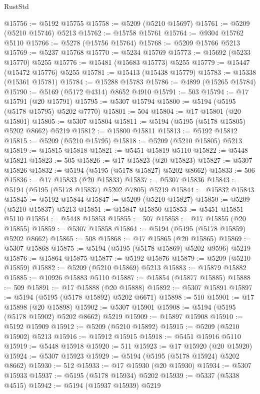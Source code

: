 \begin{lexlean}{RustStd}
\begin{coremodule}
@15756 := @5192 @15755
@15758 := @5209 (@5210 @15697)
@15761 := @5209 (@5210 @15746) @5213
@15762 := @15758 @15761
@15764 := @9304 @15762 @5110
@15766 := @5278 (@15756 @15764)
@15768 := @5209 @15766 @5213
@15769 := @5237 @15768
@15770 := @5234 @15769
@15773 := @15692 (@5233 @15770) @5255
@15776 := @15481 (@15683 @15773) @5255
@15779 := @15447 (@15472 @15776) @5255
@15781 := @15413 (@15438 @15779)
@15783 := @15338 (@15361 @15781)
@15784 := @15288 @15783
@15786 := @4899 (@15265 @15784)
@15790 := @5169 (@5172 @4314) @8652 @4910
@15791 := 503
@15794 := @17 @15791 (@20 @15791)
@15795 := @5307 @15794
@15800 := @5194 (@5195 (@5178 @15795) @5202 @7770)
@15801 := 504
@15804 := @17 @15801 (@20 @15801)
@15805 := @5307 @15804
@15811 := @5194 (@5195 (@5178 @15805) @5202 @8662) @5219
@15812 := @15800 @15811
@15813 := @5192 @15812
@15815 := @5209 (@5210 @15795)
@15818 := @5209 (@5210 @15805) @5213
@15819 := @15815 @15818
@15821 := @5451 @15819 @5110
@15822 := @5448 @15821
@15823 := 505
@15826 := @17 @15823 (@20 @15823)
@15827 := @5307 @15826
@15832 := @5194 (@5195 (@5178 @15827) @5202 @8662)
@15833 := 506
@15836 := @17 @15833 (@20 @15833)
@15837 := @5307 @15836
@15843 := @5194 (@5195 (@5178 @15837) @5202 @7805) @5219
@15844 := @15832 @15843
@15845 := @5192 @15844
@15847 := @5209 (@5210 @15827)
@15850 := @5209 (@5210 @15837) @5213
@15851 := @15847 @15850
@15853 := @5451 @15851 @5110
@15854 := @5448 @15853
@15855 := 507
@15858 := @17 @15855 (@20 @15855)
@15859 := @5307 @15858
@15864 := @5194 (@5195 (@5178 @15859) @5202 @8662)
@15865 := 508
@15868 := @17 @15865 (@20 @15865)
@15869 := @5307 @15868
@15875 := @5194 (@5195 (@5178 @15869) @5202 @9596) @5219
@15876 := @15864 @15875
@15877 := @5192 @15876
@15879 := @5209 (@5210 @15859)
@15882 := @5209 (@5210 @15869) @5213
@15883 := @15879 @15882
@15885 := @10926 @15883 @5110
@15887 := @15854 (@15877 @15885)
@15888 := 509
@15891 := @17 @15888 (@20 @15888)
@15892 := @5307 @15891
@15897 := @5194 (@5195 (@5178 @15892) @5202 @6671)
@15898 := 510
@15901 := @17 @15898 (@20 @15898)
@15902 := @5307 @15901
@15908 := @5194 (@5195 (@5178 @15902) @5202 @8662) @5219
@15909 := @15897 @15908
@15910 := @5192 @15909
@15912 := @5209 (@5210 @15892)
@15915 := @5209 (@5210 @15902) @5213
@15916 := @15912 @15915
@15918 := @5451 @15916 @5110
@15919 := @5448 @15918
@15920 := 511
@15923 := @17 @15920 (@20 @15920)
@15924 := @5307 @15923
@15929 := @5194 (@5195 (@5178 @15924) @5202 @8662)
@15930 := 512
@15933 := @17 @15930 (@20 @15930)
@15934 := @5307 @15933
@15937 := @5195 (@5178 @15934) @5202
@15939 := @5337 (@5338 @4515)
@15942 := @5194 (@15937 @15939) @5219

\end{coremodule}
\end{lexlean}
